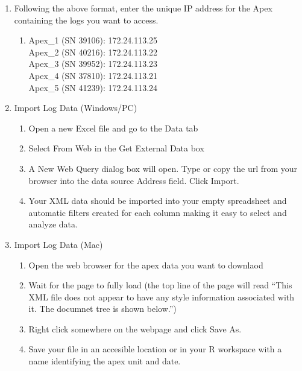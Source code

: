 \documentclass[
]{book}
\providecommand{\tightlist}{%
  \setlength{\itemsep}{0pt}\setlength{\parskip}{0pt}}
\begin{document}
\begin{enumerate}
\def\labelenumi{\arabic{enumi}.}
\tightlist
\item
  Following the above format, enter the unique IP address for the Apex containing the logs you want to access.

  \begin{enumerate}
  \def\labelenumii{\arabic{enumii}.}
  \tightlist
  \item
    Apex\_1 (SN 39106): 172.24.113.25\\
    Apex\_2 (SN 40216): 172.24.113.22\\
    Apex\_3 (SN 39952): 172.24.113.23\\
    Apex\_4 (SN 37810): 172.24.113.21\\
    Apex\_5 (SN 41239): 172.24.113.24\\
  \end{enumerate}
\item
  Import Log Data (Windows/PC)

  \begin{enumerate}
  \def\labelenumii{\arabic{enumii}.}
  \tightlist
  \item
    Open a new Excel file and go to the Data tab
  \item
    Select From Web in the Get External Data box
  \item
    A New Web Query dialog box will open. Type or copy the url from your browser into the data source Address field. Click Import.
  \item
    Your XML data should be imported into your empty spreadsheet and automatic filters created for each column making it easy to select and analyze data.
  \end{enumerate}
\item
  Import Log Data (Mac)

  \begin{enumerate}
  \def\labelenumii{\arabic{enumii}.}
  \tightlist
  \item
    Open the web browser for the apex data you want to downlaod
  \item
    Wait for the page to fully load (the top line of the page will read ``This XML file does not appear to have any style information associated with it. The documnet tree is shown below.'')
  \item
    Right click somewhere on the webpage and click Save As.
  \item
    Save your file in an accesible location or in your R workspace with a name identifying the apex unit and date.


\end{enumerate}
\end{enumerate}
\end{document}
